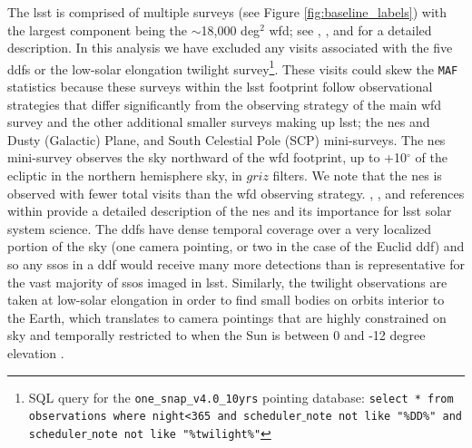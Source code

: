 \documentclass[preprintm,linenumbers]{aastex631}
\newcommand{\baselinefull}{\texttt{one\_snap\_v4.0\_10yrs}\xspace}
\newcommand{\maf}{\texttt{MAF}\xspace}
\begin{document}
	The \gls*{lsst} is comprised of multiple surveys (see Figure \ref{fig:baseline_labels}) with the largest component being the $\sim$18,000 deg$^2$ \gls*{wfd}; see \cite{SCOC_Report_1}, \cite{2022ApJS..258....1B}, and \cite{SCOC_Report_2} for a detailed description. 
	In this analysis we have excluded any visits associated with the five \glspl*{ddf} or the low-solar elongation twilight survey\footnote{SQL query for the \baselinefull pointing database: \texttt{select * from observations where night<365 and scheduler$\_$note not like "\%DD\%" and scheduler$\_$note not like "\%twilight\%"}}.
	These visits could skew the \maf statistics because these surveys within the \gls*{lsst} footprint follow  observational strategies that differ significantly from the observing strategy of the main \gls*{wfd} survey and the other additional smaller surveys making up \gls*{lsst}; the \gls*{nes} and Dusty (Galactic) Plane, and South Celestial Pole (SCP) mini-surveys. 
 The \gls*{nes} mini-survey observes the sky northward of the \gls*{wfd} footprint, up to +10$^{\circ}$ of the ecliptic in the northern hemisphere sky, in $griz$ filters. We note that the \gls*{nes} is observed with fewer total visits than the \gls*{wfd} observing strategy. 
 \cite{2018arXiv181201149S}, \cite{schwambTuningLegacySurvey2023}, and references within provide a detailed description of the \gls*{nes} and its importance for \gls*{lsst} solar system science. 
	The \glspl*{ddf} have dense temporal coverage over a very localized portion of the sky (one camera pointing, or two in the case of the Euclid \gls*{ddf}) and so any \glspl*{sso} in a \gls*{ddf} would receive many more detections than is representative for the vast majority of \glspl*{sso} imaged in \gls*{lsst}. Similarly, the twilight observations are taken at low-solar elongation in order to find small bodies on orbits interior to the Earth, which translates to camera pointings that are highly constrained on sky and  temporally restricted to when the Sun is between 0 and -12 degree elevation \citep{SCOC_Report_3}. 
\end{document}
